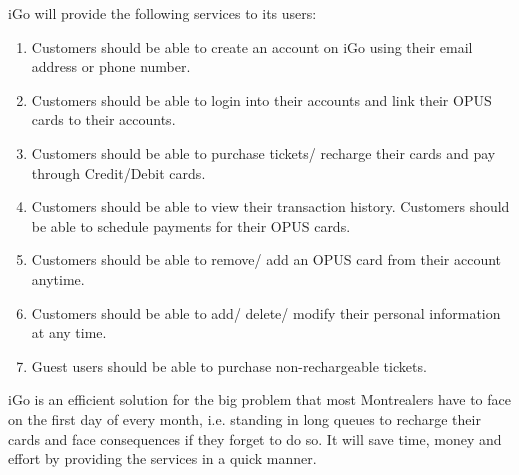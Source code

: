 \documentclass[a4paper,12pt]{article}
\begin{document}
iGo will provide the following services to its users:
\begin{enumerate}

\item Customers should be able to create an account on iGo using their email address or phone number. 
\item Customers should be able to login into their accounts and link their OPUS cards to their accounts.
\item Customers should be able to purchase tickets/ recharge their cards and pay through Credit/Debit cards.
\item Customers should be able to view their transaction history.
Customers should be able to schedule payments for their OPUS cards.
\item Customers should be able to remove/ add an OPUS card from their account anytime.
\item Customers should be able to add/ delete/ modify their personal information at any time.
\item Guest users should be able to purchase non-rechargeable tickets.\\
\end{enumerate}


iGo is an efficient solution for the big problem that most Montrealers have to face on the first day of every month, i.e. standing in long queues to recharge their cards and face consequences if they forget to do so. It will save time, money and effort by providing the services in a quick manner.
\end{document}
